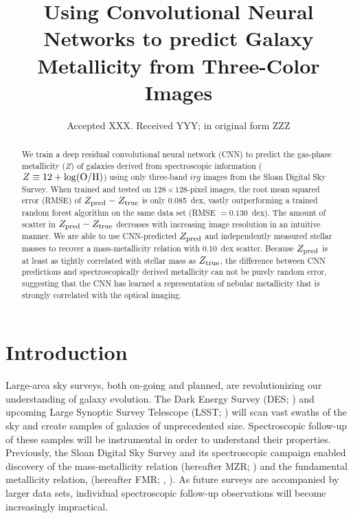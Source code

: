 \documentclass[fleqn,usenatbib]{mnras}
\title[Metallicity with CNNs]{Using Convolutional Neural Networks to predict Galaxy Metallicity from Three-Color Images}
\author[Wu and Boada]
{\parbox{\textwidth}{John~Wu$^{1}$\thanks{E-mail: \href{mailto:jw740@physics.rutgers.edu}} and
Steven~Boada$^{1}$}\vspace{0.4cm}\
\\
\parbox{\textwidth}{$^{1}$Physics and Astronomy Department, Rutgers University, Piscataway, NJ 08854-8019, USA\\}}
\date{Accepted XXX. Received YYY; in original form ZZZ}
\begin{document}
\label{firstpage}
\pagerange{\pageref{firstpage}--\pageref{lastpage}}
\maketitle

\begin{abstract}
We train a deep residual convolutional neural network (CNN) to predict the gas-phase metallicity ($Z$) of galaxies derived from spectroscopic information ($Z \equiv 12 + \log(\rm O/H)$) using only three-band $irg$ images from the Sloan Digital Sky Survey. When trained and tested on $128 \times 128$-pixel images, the root mean squared error (RMSE) of $Z_{\rm pred} - Z_{\rm true}$ is only 0.085~dex, vastly outperforming a trained random forest algorithm on the same data set (RMSE $=0.130$~dex). The amount of scatter in $Z_{\rm pred} - Z_{\rm true}$ decreases with increasing image resolution in an intuitive manner. We are able to use CNN-predicted $Z_{\rm pred}$ and independently measured stellar masses to recover a mass-metallicity relation with $0.10$~dex scatter. Because $Z_{\rm pred}$ is at least as tightly correlated with stellar mass as $Z_{\rm true}$, the difference between CNN predictions and spectroscopically derived metallicity can not be purely random error, suggesting that the CNN has learned a representation of nebular metallicity that is strongly correlated with the optical imaging.
\end{abstract}

\section{Introduction}\label{sec:introduction}
Large-area sky surveys, both on-going and planned, are revolutionizing our understanding of galaxy evolution. The Dark Energy Survey (DES; \citealt{DES2005}) and upcoming Large Synoptic Survey Telescope (LSST; \citealt{LSST2012}) will scan vast swaths of the sky and create samples of galaxies of unprecedented size. Spectroscopic follow-up of these samples will be instrumental in order to understand their properties. Previously, the Sloan Digital Sky Survey \citep[SDSS;][]{York2000} and its spectroscopic campaign enabled discovery of the mass-metallicity relation (hereafter MZR; \citealt{Tremonti2004}) and the fundamental metallicity relation, (hereafter FMR; \eg, \citealt{Mannucci2010}). As future surveys are accompanied by larger data sets, individual spectroscopic follow-up observations will become increasingly impractical.
\end{document}

